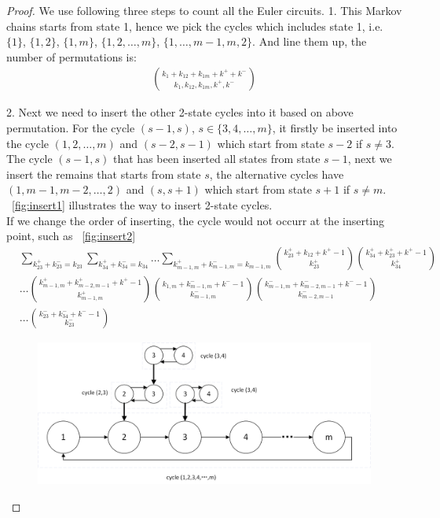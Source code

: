 \documentclass[11pt,en,cite=authoryear]{elegantpaper}
\begin{document}
\begin{proof}
    We use following three steps to count all the Euler circuits.
    1. This Markov chains starts from state 1, hence we pick the cycles which includes state 1, i.e. $\{1\}$, $\{1, 2\}$, $\{1, m\}$, $\{1, 2, \dots, m\}$, $\{1, \dots, m-1,m, 2\}$. And line them up, the number of permutations is:
    \begin{align*}
        \binom{k_{1}+k_{12}+k_{1m}+k^{+}+k^{-}}{k_{1}, k_{12}, k_{1m}, k^{+}, k^{-}}
    \end{align*}
    
    2. Next we need to insert the other 2-state cycles into it based on above permutation.
    For the cycle $(s-1, s)$, $s \in \{3, 4, \dots , m\}$, it firstly be inserted into the cycle $(1, 2, \dots, m)$ and $(s-2, s-1)$ which start from state $s-2$ if $s \neq 3$.
    The cycle $(s-1, s)$ that has been inserted all states from state $s-1$, next we insert the remains that starts from state $s$, the  alternative cycles have $(1, m-1,m-2, \dots, 2)$ and $(s, s+1)$ which start from state $s+1$ if $s \neq m$. ~\ref{fig:insert1} illustrates the way to insert 2-state cycles.\\
    If we change the order of inserting, the cycle would not occurr at the inserting point, such as ~\ref{fig:insert2}
    \begin{align*}
        &\sum_{k_{23}^{+}+k_{23}^{-}=k_{23}} \sum_{k_{34}^{+}+k_{34}^{-}=k_{34}}
        \dots \sum_{k_{m-1,m}^{+}+k_{m-1,m}^{-}=k_{m-1,m}}
        \binom{k_{23}^{+}+k_{12}+k^{+}-1}{k_{23}^{+}} \binom{k_{34}^{+}+k_{23}^{+}+k^{+}-1}{k_{34}^{+}} \\
        &\dots \binom{k_{m-1, m}^{+}+ k^{+}_{m-2, m-1} + k^{+}  -1}{k_{m-1, m}^{+}} \binom{k_{1, m} + k_{m-1, m}^{-} + k^{-} -1}{k_{m-1, m}^{-}} \binom{k_{m-1, m}^{-} + k_{m-2, m-1}^{-} + k^{-} - 1}{k_{m-2, m-1}^{-}} \\
        &\dots \binom{k_{23}^{-} + k_{34}^{-} + k^{-} - 1}{k_{23}^{-}}
    \end{align*}
    \begin{figure}[h]  
        \centering
        \includegraphics[scale=0.5]{chart/insert1.png}

\end{figure}
\end{proof}
\end{document}
